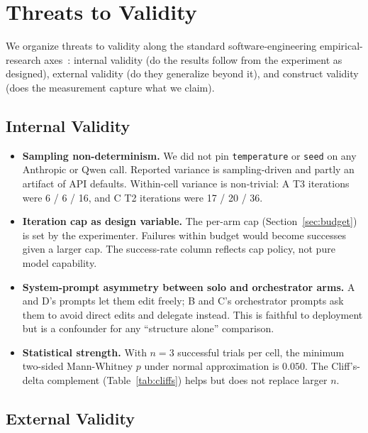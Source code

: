 \documentclass[11pt,a4paper]{article}
\begin{document}
\section{Threats to Validity}
\label{sec:limitations}

We organize threats to validity along the standard software-engineering empirical-research axes~\citep{wohlin2012experimentation}: internal validity (do the results follow from the experiment as designed), external validity (do they generalize beyond it), and construct validity (does the measurement capture what we claim).

\subsection{Internal Validity}

\begin{itemize}
    \item \textbf{Sampling non-determinism.} We did not pin \texttt{temperature} or \texttt{seed} on any Anthropic or Qwen call. Reported variance is sampling-driven and partly an artifact of API defaults. Within-cell variance is non-trivial: A T3 iterations were 6 / 6 / 16, and C T2 iterations were 17 / 20 / 36.
    \item \textbf{Iteration cap as design variable.} The per-arm cap (Section~\ref{sec:budget}) is set by the experimenter. Failures within budget would become successes given a larger cap. The success-rate column reflects cap policy, not pure model capability.
    \item \textbf{System-prompt asymmetry between solo and orchestrator arms.} A and D's prompts let them edit freely; B and C's orchestrator prompts ask them to avoid direct edits and delegate instead. This is faithful to deployment but is a confounder for any ``structure alone'' comparison.
    \item \textbf{Statistical strength.} With $n = 3$ successful trials per cell, the minimum two-sided Mann-Whitney $p$ under normal approximation is $0.050$. The Cliff's-delta complement (Table~\ref{tab:cliffs}) helps but does not replace larger $n$.
\end{itemize}

\subsection{External Validity}
\end{document}

